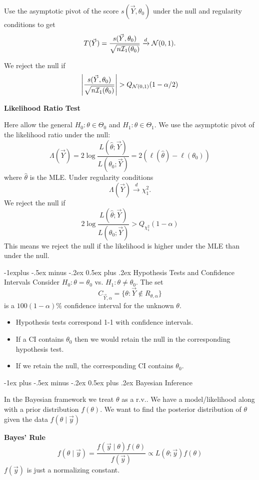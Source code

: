 \documentclass[10pt,landscape]{article}
\makeatletter
\renewcommand{\section}{\@startsection{section}{1}{0mm}%
                                {-1ex plus -.5ex minus -.2ex}%
                                {0.5ex plus .2ex}%
                                {\normalfont\large\bfseries}}
\renewcommand{\subsection}{\@startsection{subsection}{2}{0mm}%
                                {-1explus -.5ex minus -.2ex}%
                                {0.5ex plus .2ex}%
                                {\normalfont\normalsize\bfseries}}
\makeatother
\begin{document}
\begin{multicols*}{3}
Use the asymptotic pivot of the score $s(\vec Y,\theta_0)$ under the null and regularity conditions to get $$T(\vec Y)=\frac{s(\vec Y,\theta_0)}{\sqrt{n\mathcal{I}_1(\theta_0)}}\xrightarrow{d} \mathcal{N}(0,1).$$

We reject the null if
$$\left|\frac{s(\vec Y,\theta_0)}{\sqrt{n\mathcal{I}_1(\theta_0)}}\right|>Q_{\cN(0,1)}(1-\alpha/2)$$

\textbf{Likelihood Ratio Test}

Here allow the general $H_0:\theta\in\Theta_0$ and $H_1:\theta\in\Theta_1$. We use the asymptotic pivot of the likelihood ratio under the null: $$\Lambda(\vec Y)=2\log \frac{L(\hat{\theta};\vec Y)}{L(\theta_0;\vec Y)}=2(\ell(\hat{\theta})-\ell(\theta_0)) $$
where $\hat\theta$ is the MLE. Under regularity conditions
$$\Lambda(\vec Y)\xrightarrow{d}\chi_1^2.$$ We reject the null if
$$
2\log \frac{L(\hat{\theta};\vec Y)}{L(\theta_0;\vec Y)}>Q_{\chi^2_1}(1-\alpha)
$$
This means we reject the null if the likelihood is higher under the MLE than under the null.

\subsection{Hypothesis Tests and Confidence Intervals}
Consider $H_0:\theta=\theta_0$ vs. $H_1:\theta\neq\theta_0$. The set
$$
C_{\vec{Y},\alpha}=\{\theta:\vec{Y}\not\in R_{\theta,\alpha}\}
$$
is a $100(1-\alpha)\%$ confidence interval for the unknown $\theta$.
\begin{itemize}
    \item Hypothesis tests correspond 1-1 with confidence intervals.
    \item If a CI contains $\theta_0$ then we would retain the null in the corresponding hypothesis test.
    \item If we retain the null, the corresponding CI contains $\theta_0$.
\end{itemize}

\section{Bayesian Inference}

In the Bayesian framework we treat $\theta$ as a r.v.. We have a model/likelihood along with a prior distribution $f(\theta)$. We want to find the posterior distribution of $\theta$ given the data $f(\theta\mid\vec y)$

\textbf{Bayes' Rule}
$$
f(\theta\mid\vec y)=\frac{f(\vec y\mid\theta)f(\theta)}{f(\vec y)}\propto L(\theta;\vec y)f(\theta)
$$
$f(\vec y)$ is just a normalizing constant.


\end{multicols*}
\end{document}
